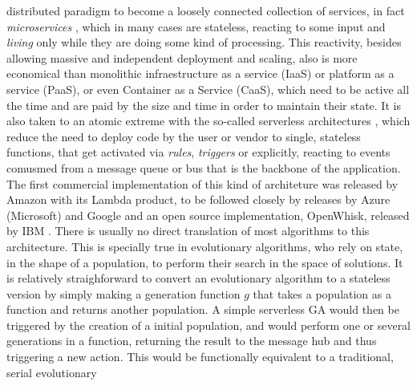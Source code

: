 \documentclass[sigconf]{acmart}
\begin{document}
  distributed paradigm to become a loosely connected collection of
  services, in fact {\em microservices} \cite{microservices}, which in many cases are stateless, reacting to some input and
  {\em living} only while they are doing some kind of processing. This
  reactivity, besides allowing massive and independent deployment and
  scaling, also is more economical than monolithic infraestructure as
  a service (IaaS) or platform as a service (PaaS), or even Container
  as a Service (CaaS), which need to be active all the time and are
  paid by the size and time in order to maintain their state.
  It is also taken to an atomic extreme
  with the so-called serverless architectures \cite{Varghese2018849},
  which reduce the need to deploy code by the user or vendor to single, stateless
  functions, that get activated via {\em rules}, {\em triggers} or
  explicitly, reacting to events comusmed from
  a message queue or bus that
  is the backbone of the application. The first commercial
  implementation of this kind of architeture was released by Amazon
  with its Lambda product, to be followed closely by releases by Azure
  (Microsoft) and Google and an open source implementation, OpenWhisk,
  released by IBM \cite{Baldini2016287}.
There is usually no direct translation of most algorithms to this
architecture. This is specially true in evolutionary algorithms, who
rely on state, in the shape of a population, to perform their search
in the space of solutions. It is relatively straighforward to convert
an evolutionary algorithm to a stateless version by simply making a
{\sf generation} function $g$ that takes a population as a function
and returns another population. A simple serverless GA would then be
triggered by the creation of a initial population, and would perform
one or several generations in a function, returning the result to the
message hub and thus triggering a new action. This would be
functionally equivalent to a traditional, serial evolutionary
\end{document}
